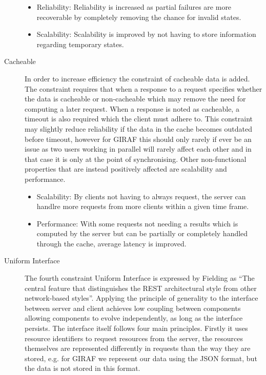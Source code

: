 \begin{description}
\begin{itemize}
        \item Reliability: Reliability is increased as partial failures are more recoverable by completely removing the chance for invalid states.
        \item Scalability: Scalability is improved by not having to store information regarding temporary states.
    \end{itemize}
    \item [Cacheable] In order to increase efficiency the constraint of cacheable data is added.
    The constraint requires that when a response to a request specifies whether the data is cacheable or non-cacheable which may remove the need for computing a later request.
    When a response is noted as cacheable, a timeout is also required which the client must adhere to.
    This constraint may slightly reduce reliability if the data in the cache becomes outdated before timeout, however for GIRAF this should only rarely if ever be an issue as two users working in parallel will rarely affect each other and in that case it is only at the point of synchronising.
    Other non-functional properties that are instead positively affected are scalability and performance.
    \begin{itemize}
        \item Scalability: By clients not having to always request, the server can handlre more requests from more clients within a given time frame.
        \item Performance: With some requests not needing a results which is computed by the server but can be partially or completely handled through the cache, average latency is improved.
    \end{itemize}
    \item [Uniform Interface] The fourth constraint Uniform Interface is expressed by Fielding as \enquote{The central feature that distinguishes the REST architectural style from other network-based styles}\citep{fielding2000rest}.
    Applying the principle of generality to the interface between server and client achieves low coupling between components allowing components to evolve independently, as long as the interface persists. 
    The interface itself follows four main principles.
    Firstly it uses resource identifiers to request resources from the server, the resources themselves are represented differently in requests than the way they are stored, e.g. for GIRAF we represent our data using the JSON format, but the data is not stored in this format.

\end{description}

